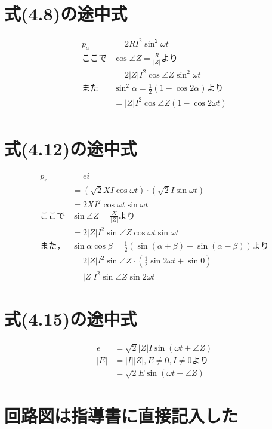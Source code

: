 \documentclass[11pt,dvipdfmx]{ujarticle}
\begin{document}
\section{式(4.8)の途中式}
\begin{align*}
	p_{a}&=2RI^{2}\sin ^{2} \omega t\\
	ここで&\cos \angle Z=\frac{R}{|Z|}より\\
	&=2|Z|I^{2}\cos \angle Z\sin ^{2} \omega t\\
	また&\sin ^{2} \alpha =\frac{1}{2}\left(1-\cos 2 \alpha\right)より\\
	&=|Z|I^{2}\cos \angle Z(1-\cos 2\omega t)\\
\end{align*}

\section{式(4.12)の途中式}
\begin{align*}
	p_{r}&=ei\\
	&=(\sqrt{2}XI\cos \omega t) \cdot (\sqrt{2}I\sin \omega t)\\
	&=2XI^{2}\cos \omega t \sin \omega t\\
	ここで&\sin \angle Z=\frac{X}{|Z|}より\\
	&=2|Z|I^{2}\sin \angle Z\cos \omega t \sin \omega t\\
	また，&\sin \alpha \cos \beta=\frac{1}{2}\left(\sin (\alpha +\beta)+\sin (\alpha -\beta)\right)より\\
	&=2|Z|I^{2}\sin \angle Z \cdot \left(\frac{1}{2}\sin 2 \omega t+\sin 0\right)\\
	&=|Z|I^{2}\sin \angle Z \sin 2\omega t
\end{align*}

\section{式(4.15)の途中式}
\begin{align*}
	e&=\sqrt{2}|Z|I\sin (\omega t +\angle Z)\\
	|E|&=|I||Z|, E\neq 0, I\neq 0より\\
	&=\sqrt{2}E\sin (\omega t +\angle Z)
\end{align*}

\section{回路図は指導書に直接記入した}
\printbibliography[title=参考文献]
\end{document}
